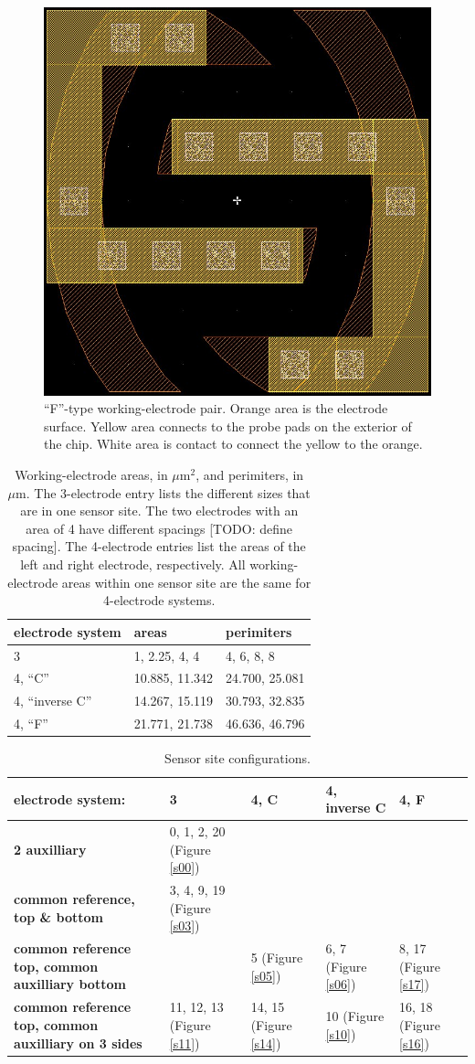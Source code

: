 \begin{figure}
	\centering
	\includegraphics[width=0.3\linewidth]{figures/4-F.png}
	\caption[``F''-type working-electrode pair.]{``F''-type working-electrode pair. Orange area is the electrode surface. Yellow area connects to the probe pads on the exterior of the chip. White area is contact to connect the yellow to the orange.}
	\label{4-F}
\end{figure}

\begin{table}
	\begin{tabular}{l|l|l}
		\textbf{electrode system} & \textbf{areas} & \textbf{perimiters} \\
		\hline
		3 & 1, 2.25, 4, 4 & 4, 6, 8, 8 \\
		4, ``C'' & 10.885, 11.342 & 24.700, 25.081 \\
		4, ``inverse C'' & 14.267, 15.119 & 30.793, 32.835 \\
		4, ``F'' & 21.771, 21.738 & 46.636, 46.796
	\end{tabular}
	\caption[Working-electrode areas and perimiters.]{Working-electrode areas, in $\mu \mathrm{m}^2$, and perimiters, in $\mu \mathrm{m}$. The 3-electrode entry lists the different sizes that are in one sensor site. The two electrodes with an area of 4 have different spacings [TODO: define spacing]. The 4-electrode entries list the areas of the left and right electrode, respectively. All working-electrode areas within one sensor site are the same for 4-electrode systems.}
	\label{electrode-area}
\end{table}

\begin{table}
	\begin{tabular}{p{4cm}|p{2cm}|p{2cm}|p{2.5cm}|p{2cm}}
		electrode system: & \textbf{3} & \textbf{4, C} & \textbf{4, inverse C} & \textbf{4, F} \\
		\hline
		\textbf{2 auxilliary} & 0, 1, 2, 20 (Figure \ref{s00}) & & & \\
		\hline
		\textbf{common reference, top \& bottom} & 3, 4, 9, 19 (Figure \ref{s03}) & & & \\
		\hline
		\textbf{common reference top, common auxilliary bottom} & & 5 (Figure \ref{s05}) & 6, 7 (Figure \ref{s06}) & 8, 17 (Figure \ref{s17}) \\
		\hline
		\textbf{common reference top, common auxilliary on 3 sides} & 11, 12, 13 (Figure \ref{s11}) & 14, 15 (Figure \ref{s14}) & 10 (Figure \ref{s10}) & 16, 18 (Figure \ref{s16})
	\end{tabular}
	\caption{Sensor site configurations.}
	\label{sensor-config}
\end{table}

